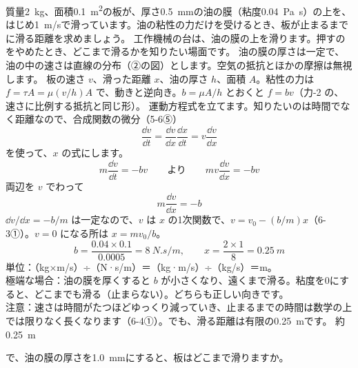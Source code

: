 \begin{phreidai}[油の膜の上を滑る板が止まるまで]\label{ph:力-14:ex13}
質量\qty{2}{kg}、面積\qty{0.1}{m^2}の板が、厚さ\qty{0.5}{mm}の油の膜（粘度\qty{0.04}{Pa.s}）の上を、はじめ\qty{1}{m/s}で滑っています。油の粘性の力だけを受けるとき、板が止まるまでに滑る距離を求めましょう。
\phbamen
工作機械の台は、油の膜の上を滑ります。押すのをやめたとき、どこまで滑るかを知りたい場面です。
\phmushi
油の膜の厚さは一定で、油の中の速さは直線の分布（②の図）とします。空気の抵抗とほかの摩擦は無視します。
\phzu
板の速さ $v$、滑った距離 $x$、油の厚さ $h$、面積 $A$。粘性の力は $f=\tau A=\mu (v/h)A$ で、動きと逆向き。$b=\mu A/h$ とおくと $f=bv$（力-2 の、速さに比例する抵抗と同じ形）。
\phriyu
運動方程式を立てます。知りたいのは時間でなく距離なので、合成関数の微分（5-6⑤）
\[ \frac{\dd v}{\dd t}=\frac{\dd v}{\dd x}\frac{\dd x}{\dd t}=v\frac{\dd v}{\dd x} \]
を使って、$x$ の式にします。
\phtateru
\[m\frac{\dd v}{\dd t}=-bv\qquad\text{より}\qquad mv\frac{\dd v}{\dd x}=-bv\]
両辺を $v$ でわって
\[m\frac{\dd v}{\dd x}=-b\]
\phtoku
$\dd v/\dd x=-b/m$ は一定なので、$v$ は $x$ の1次関数で、$v=v_0-(b/m)x$（6-3①）。$v=0$ になる所は $x=mv_0/b$。
\[b=\frac{0.04\times0.1}{0.0005}=\qty{8}{N.s/m},\qquad x=\frac{2\times1}{8}=\qty{0.25}{m}\]
\phtashikame
単位：（kg×m/s）÷（N·s/m）＝（kg·m/s）÷（kg/s）＝m。\\
極端な場合：油の膜を厚くすると $b$ が小さくなり、遠くまで滑る。粘度を0にすると、どこまでも滑る（止まらない）。どちらも正しい向きです。\\
注意：速さは時間がたつほどゆっくり減っていき、止まるまでの時間は数学の上では限りなく長くなります（6-4①）。でも、滑る距離は有限の\qty{0.25}{m}です。
\kotae 約\qty{0.25}{m}
\end{phreidai}
\begin{jibun}
で、油の膜の厚さを\qty{1.0}{mm}にすると、板はどこまで滑りますか。
\end{jibun}

